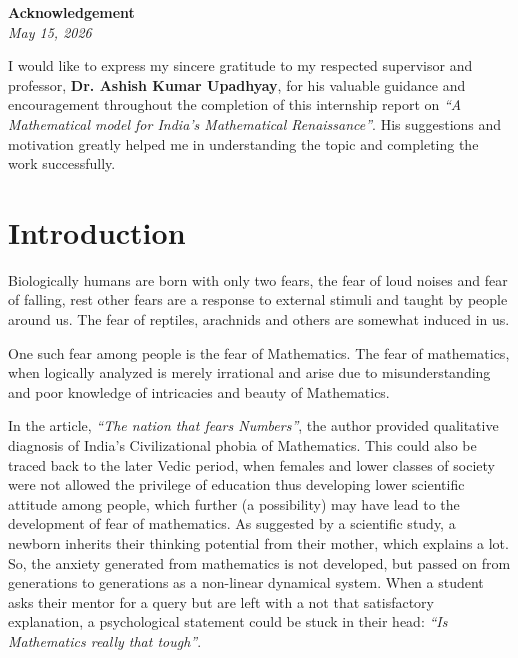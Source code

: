 \documentclass[12pt,a4paper]{article}
\begin{document}
\newpage
{}

\begin{center}
    {\Large \textbf{Acknowledgement}}\\[0.3cm]
    \textit{May 15, 2026}
\end{center}

\vspace{0.8cm}

I would like to express my sincere gratitude to my respected supervisor and professor, \textbf{Dr. Ashish Kumar Upadhyay}, for his valuable guidance and encouragement throughout the completion of this internship report on \textit{“A Mathematical model for India’s Mathematical Renaissance”}. His suggestions and motivation greatly helped me in understanding the topic and completing the work successfully.

\newpage

\cleardoublepage
{}
\tableofcontents
\newpage


\section{Introduction}

Biologically humans are born with only two fears, the fear of loud noises and fear of falling, rest other fears are a response to external stimuli and taught by people around us. The fear of reptiles, arachnids and others are somewhat induced in us.

One such fear among people is the fear of Mathematics. The fear of mathematics, when logically analyzed is merely irrational and arise due to misunderstanding and poor knowledge of intricacies and beauty of Mathematics.

In the article, \textit{“The nation that fears Numbers”}, the author provided qualitative diagnosis of India’s Civilizational phobia of Mathematics. This could also be traced back to the later Vedic period, when females and lower classes of society were not allowed the privilege of education thus developing lower scientific attitude among people, which further (a possibility) may have lead to the development of fear of mathematics. As suggested by a scientific study, a newborn inherits their thinking potential from their mother, which explains a lot. So, the anxiety generated from mathematics is not developed, but passed on from generations to generations as a non-linear dynamical system. When a student asks their mentor for a query but are left with a not that satisfactory explanation, a psychological statement could be stuck in their head: \textit{“Is Mathematics really that tough”}.
\end{document}

